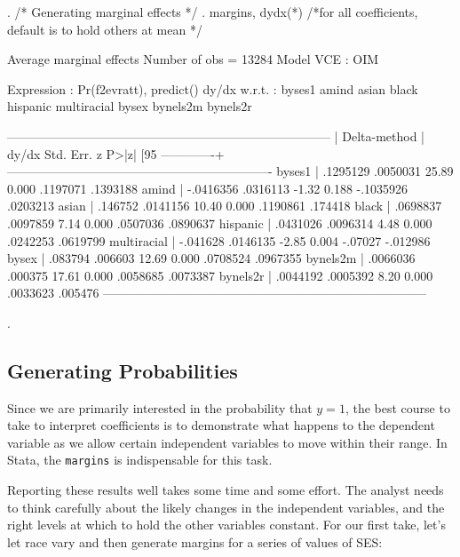 \documentclass[12pt]{article}
\begin{document}
\begin{stlog}
. /* Generating marginal effects */
. margins, dydx(*) /*for all coefficients, default is to hold others at mean */  

Average marginal effects                          Number of obs   =      13284
Model VCE    : OIM

Expression   : Pr(f2evratt), predict()
dy/dx w.r.t. : byses1 amind asian black hispanic multiracial bysex bynels2m bynels2r

------------------------------------------------------------------------------
             |            Delta-method
             |      dy/dx   Std. Err.      z    P>|z|     [95%
-------------+----------------------------------------------------------------
      byses1 |   .1295129   .0050031    25.89   0.000     .1197071    .1393188
       amind |  -.0416356   .0316113    -1.32   0.188    -.1035926    .0203213
       asian |    .146752   .0141156    10.40   0.000     .1190861     .174418
       black |   .0698837   .0097859     7.14   0.000     .0507036    .0890637
    hispanic |   .0431026   .0096314     4.48   0.000     .0242253    .0619799
 multiracial |   -.041628   .0146135    -2.85   0.004      -.07027    -.012986
       bysex |    .083794    .006603    12.69   0.000     .0708524    .0967355
    bynels2m |   .0066036    .000375    17.61   0.000     .0058685    .0073387
    bynels2r |   .0044192   .0005392     8.20   0.000     .0033623     .005476
------------------------------------------------------------------------------

. 
\end{stlog}



\subsection{Generating Probabilities}

Since we are primarily interested in the probability that $y=1$, the
best course to take to interpret coefficients is to demonstrate what
happens to the dependent variable as we allow certain independent
variables to move within their range. In Stata, the \texttt{margins}
is indispensable for this task.

Reporting these results well takes some time and some effort. The
analyst needs to think carefully about the likely changes in the
independent variables, and the right levels at which to hold the other
variables constant. For our first take, let's let race vary and then
generate margins for a series of values of SES: 
\end{document}
